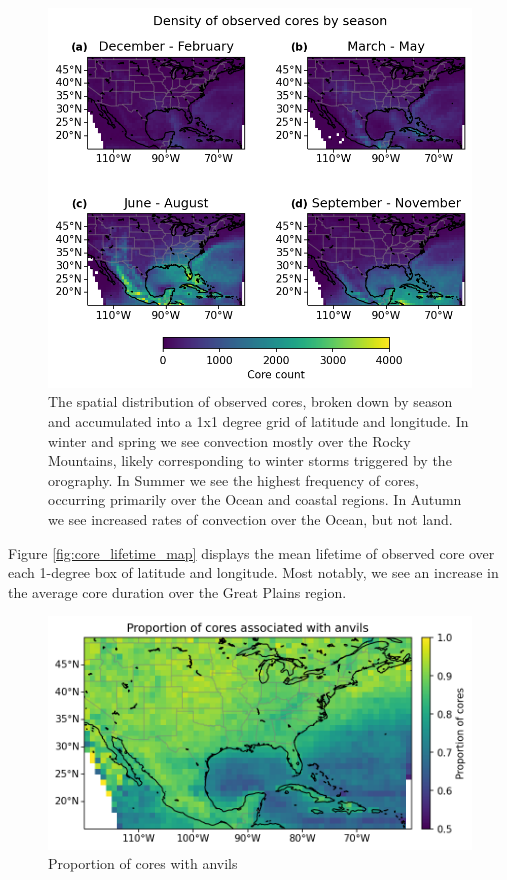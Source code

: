 \begin{figure}[tp]
    \centering
    \includegraphics[width=\textwidth]{figures/ch2_03.png}
    \caption{The spatial distribution of observed cores, broken down by season and accumulated into a 1x1 degree grid of latitude and longitude. In winter and spring we see convection mostly over the Rocky Mountains, likely corresponding to winter storms triggered by the orography. In Summer we see the highest frequency of cores, occurring primarily over the Ocean and coastal regions. In Autumn we see increased rates of convection over the Ocean, but not land. }
    \label{fig:core_density_by_season}
\end{figure}

Figure \ref{fig:core_lifetime_map} displays the mean lifetime of observed core over each 1-degree box of latitude and longitude.
Most notably, we see an increase in the average core duration over the Great Plains region.

\begin{figure}[tp]
    \centering
    \includegraphics[width=\textwidth]{figures/ch2_04.png}
    \caption{Proportion of cores with anvils}
    \label{fig:cores_with_anvils_map}
\end{figure}

